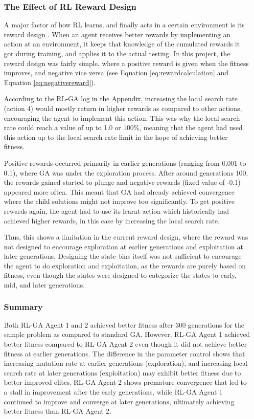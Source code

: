 \documentclass{article}
\begin{document}
\subsubsection{The Effect of RL Reward Design}
A major factor of how RL learns, and finally acts in a certain environment is its reward design \parencite{sutton2018reinforcement}. When an agent receives better rewards by implementing an action at an environment, it keeps that knowledge of the cumulated rewards it got during training, and applies it to the actual testing. In this project, the reward design was fairly simple, where a positive reward is given when the fitness improves, and negative vice versa (see Equation \ref{eq:rewardcalculation} and Equation \ref{eq:negativereward}). 

According to the RL-GA log in the Appendix, increasing the local search rate (action 4) would mostly return in higher rewards as compared to other actions, encouraging the agent to implement this action. This was why the local search rate could reach a value of up to 1.0 or 100\%, meaning that the agent had used this action up to the local search rate limit in the hope of achieving better fitness. 

Positive rewards occurred primarily in earlier generations (ranging from 0.001 to 0.1), where GA was under the exploration process. After around generations 100, the rewards gained started to plunge and negative rewards (fixed value of -0.1) appeared more often. This meant that GA had already achieved convergence where the child solutions might not improve too significantly. To get positive rewards again, the agent had to use its learnt action which historically had achieved higher rewards, in this case by increasing the local search rate.

Thus, this shows a limitation in the current reward design, where the reward was not designed to encourage exploration at earlier generations and exploitation at later generations. Designing the state bins itself was not sufficient to encourage the agent to do exploration and exploitation, as the rewards are purely based on fitness, even though the states were designed to categorize the states to early, mid, and later generations.

\subsubsection{Summary}
Both RL-GA Agent 1 and 2 achieved better fitness after 300 generations for the sample problem as compared to standard GA. However, RL-GA Agent 1 achieved better fitness compared to RL-GA Agent 2 even though it did not achieve better fitness at earlier generations. The difference in the parameter control shows that increasing mutation rate at earlier generations (exploration), and increasing local search rate at later generations (exploitation) may exhibit better fitness due to better improved elites. RL-GA Agent 2 shows premature convergence that led to a stall in improvement after the early generations, while RL-GA Agent 1 continued to improve and converge at later generations, ultimately achieving better fitness than RL-GA Agent 2.
\end{document}
